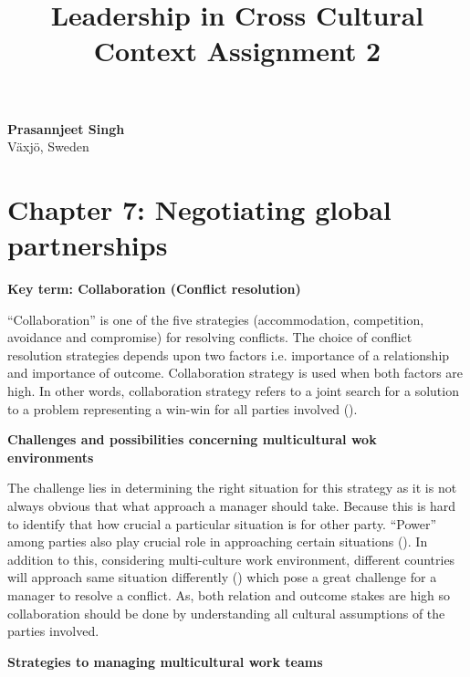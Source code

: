 \documentclass{article}
\title{Leadership in Cross Cultural Context Assignment 2 }
\begin{document}
\maketitle


\begin{center}
    \large \textbf{Prasannjeet Singh}\\
    \small Växjö, Sweden
\end{center}


\section*{Chapter 7: Negotiating global partnerships}
\textbf{Key term: Collaboration (Conflict resolution)}
    
“Collaboration” is one of the five strategies (accommodation, competition, avoidance and compromise) for resolving conflicts. The choice of conflict resolution strategies depends upon two factors i.e. importance of a relationship and importance of outcome. Collaboration strategy is used when both factors are high. In other words, collaboration strategy refers to a joint search for a solution to a problem representing a win-win for all parties involved (\cite[p.~212]{steers2013management}). 

\textbf{Challenges and possibilities concerning multicultural wok environments}

The challenge lies in determining the right situation for this strategy as it is not always obvious that what approach a manager should take. Because this is hard to identify that how crucial a particular situation is for other party. “Power” among parties also play crucial role in approaching certain situations (\cite[p.~213]{steers2013management}). In addition to this, considering multi-culture work environment, different countries will approach same situation differently (\cite[p.~214]{steers2013management}) which pose a great challenge for a manager to resolve a conflict. As, both relation and outcome stakes are high so collaboration should be done by understanding all cultural assumptions of the parties involved.

\textbf{Strategies to managing multicultural work teams}
\end{document}
